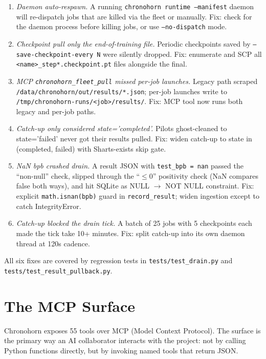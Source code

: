 \documentclass[11pt,openany]{book}
\theoremstyle{definition}
\theoremstyle{plain}
\begin{document}
\begin{enumerate}
  \item \emph{Daemon auto-respawn.} A running
    \texttt{chronohorn runtime --manifest} daemon will re-dispatch jobs
    that are killed via the fleet or manually. Fix: check for the
    daemon process before killing jobs, or use \texttt{--no-dispatch}
    mode.
  \item \emph{Checkpoint pull only the end-of-training file.} Periodic
    checkpoints saved by \texttt{--save-checkpoint-every N} were
    silently dropped. Fix: enumerate and SCP all
    \texttt{<name>\_step*.checkpoint.pt} files alongside the final.
  \item \emph{MCP \texttt{chronohorn\_fleet\_pull} missed per-job
    launches.} Legacy path scraped
    \texttt{/data/chronohorn/out/results/*.json}; per-job launches
    write to \texttt{/tmp/chronohorn-runs/<job>/results/}. Fix: MCP
    tool now runs both legacy and per-job paths.
  \item \emph{Catch-up only considered state='completed'.} Pilots
    ghost-cleaned to state='failed' never got their results pulled.
    Fix: widen catch-up to state in (completed, failed) with
    Sharts-exists skip gate.
  \item \emph{NaN bpb crashed drain.} A result JSON with
    \texttt{test\_bpb = nan} passed the ``non-null'' check,
    slipped through the ``$\leq 0$'' positivity check (NaN compares
    false both ways), and hit SQLite as NULL $\to$ NOT NULL
    constraint. Fix: explicit \texttt{math.isnan(bpb)} guard in
    \texttt{record\_result}; widen ingestion except to catch
    IntegrityError.
  \item \emph{Catch-up blocked the drain tick.} A batch of 25 jobs
    with 5 checkpoints each made the tick take 10+ minutes. Fix:
    split catch-up into its own daemon thread at 120s cadence.
\end{enumerate}

All six fixes are covered by regression tests in
\texttt{tests/test\_drain.py} and \texttt{tests/test\_result\_pullback.py}.

\chapter{The MCP Surface}
\label{ch:mcp}

Chronohorn exposes 55 tools over MCP (Model Context Protocol). The
surface is the primary way an AI collaborator interacts with the project:
not by calling Python functions directly, but by invoking named tools
that return JSON.
\end{document}
